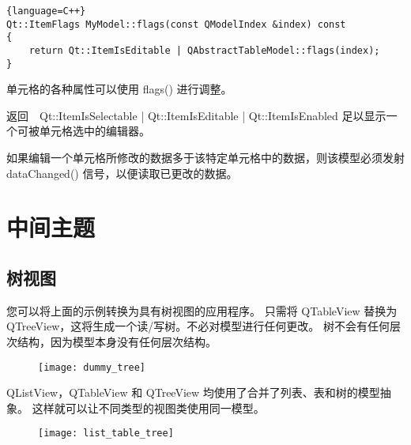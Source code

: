 \begin{lstlisting}{language=C++}
Qt::ItemFlags MyModel::flags(const QModelIndex &index) const
{
    return Qt::ItemIsEditable | QAbstractTableModel::flags(index);
}
\end{lstlisting}

单元格的各种属性可以使用 flags() 进行调整。

返回　Qt::ItemIsSelectable | Qt::ItemIsEditable | Qt::ItemIsEnabled 足以显示一个可被单元格选中的编辑器。

如果编辑一个单元格所修改的数据多于该特定单元格中的数据，则该模型必须发射　dataChanged() 信号，以便读取已更改的数据。

\section{中间主题}

\subsection{树视图}

您可以将上面的示例转换为具有树视图的应用程序。
只需将 QTableView 替换为 QTreeView，这将生成一个读/写树。不必对模型进行任何更改。
树不会有任何层次结构，因为模型本身没有任何层次结构。

\begin{figure}[hbt!]  
\texttt{[image: dummy\_tree]}
\end{figure}


QListView，QTableView 和 QTreeView 均使用了合并了列表、表和树的模型抽象。
这样就可以让不同类型的视图类使用同一模型。

\begin{figure}[hbt!]  
\texttt{[image: list\_table\_tree]}
\end{figure}